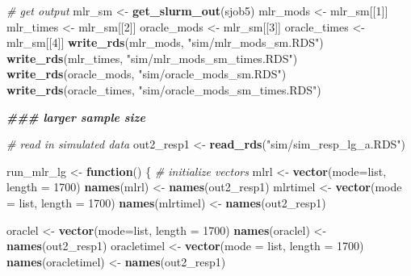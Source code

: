 \documentclass[12pt, twoside]{amherstthesis}
\newenvironment{Shaded}{\begin{snugshade}}{\end{snugshade}}
\newcommand{\AttributeTok}[1]{\textcolor[rgb]{0.13,0.29,0.53}{#1}}
\newcommand{\CommentTok}[1]{\textcolor[rgb]{0.56,0.35,0.01}{\textit{#1}}}
\newcommand{\ControlFlowTok}[1]{\textcolor[rgb]{0.13,0.29,0.53}{\textbf{#1}}}
\newcommand{\DecValTok}[1]{\textcolor[rgb]{0.00,0.00,0.81}{#1}}
\newcommand{\DocumentationTok}[1]{\textcolor[rgb]{0.56,0.35,0.01}{\textbf{\textit{#1}}}}
\newcommand{\FunctionTok}[1]{\textcolor[rgb]{0.13,0.29,0.53}{\textbf{#1}}}
\newcommand{\NormalTok}[1]{#1}
\newcommand{\OtherTok}[1]{\textcolor[rgb]{0.56,0.35,0.01}{#1}}
\newcommand{\StringTok}[1]{\textcolor[rgb]{0.31,0.60,0.02}{#1}}
\begin{document}
\begin{Shaded}
\begin{Highlighting}[]
\CommentTok{\# get output}
\NormalTok{mlr\_sm }\OtherTok{\textless{}{-}} \FunctionTok{get\_slurm\_out}\NormalTok{(sjob5)}
\NormalTok{mlr\_mods }\OtherTok{\textless{}{-}}\NormalTok{ mlr\_sm[[}\DecValTok{1}\NormalTok{]]}
\NormalTok{mlr\_times }\OtherTok{\textless{}{-}}\NormalTok{ mlr\_sm[[}\DecValTok{2}\NormalTok{]]}
\NormalTok{oracle\_mods }\OtherTok{\textless{}{-}}\NormalTok{ mlr\_sm[[}\DecValTok{3}\NormalTok{]]}
\NormalTok{oracle\_times }\OtherTok{\textless{}{-}}\NormalTok{ mlr\_sm[[}\DecValTok{4}\NormalTok{]]}
\FunctionTok{write\_rds}\NormalTok{(mlr\_mods, }\StringTok{"sim/mlr\_mods\_sm.RDS"}\NormalTok{)}
\FunctionTok{write\_rds}\NormalTok{(mlr\_times, }\StringTok{"sim/mlr\_mods\_sm\_times.RDS"}\NormalTok{)}
\FunctionTok{write\_rds}\NormalTok{(oracle\_mods, }\StringTok{"sim/oracle\_mods\_sm.RDS"}\NormalTok{)}
\FunctionTok{write\_rds}\NormalTok{(oracle\_times, }\StringTok{"sim/oracle\_mods\_sm\_times.RDS"}\NormalTok{)}

\DocumentationTok{\#\#\# larger sample size}

\CommentTok{\# read in simulated data}
\NormalTok{out2\_resp1 }\OtherTok{\textless{}{-}} \FunctionTok{read\_rds}\NormalTok{(}\StringTok{"sim/sim\_resp\_lg\_a.RDS"}\NormalTok{)}

\NormalTok{run\_mlr\_lg }\OtherTok{\textless{}{-}} \ControlFlowTok{function}\NormalTok{() \{}
  \CommentTok{\# initialize vectors}
\NormalTok{  mlrl }\OtherTok{\textless{}{-}} \FunctionTok{vector}\NormalTok{(}\AttributeTok{mode=}\StringTok{\textquotesingle{}list\textquotesingle{}}\NormalTok{, }\AttributeTok{length =} \DecValTok{1700}\NormalTok{)}
  \FunctionTok{names}\NormalTok{(mlrl) }\OtherTok{\textless{}{-}} \FunctionTok{names}\NormalTok{(out2\_resp1)}
\NormalTok{  mlrtimel }\OtherTok{\textless{}{-}} \FunctionTok{vector}\NormalTok{(}\AttributeTok{mode =} \StringTok{\textquotesingle{}list\textquotesingle{}}\NormalTok{, }\AttributeTok{length =} \DecValTok{1700}\NormalTok{)}
  \FunctionTok{names}\NormalTok{(mlrtimel) }\OtherTok{\textless{}{-}} \FunctionTok{names}\NormalTok{(out2\_resp1)}
  
\NormalTok{  oraclel }\OtherTok{\textless{}{-}} \FunctionTok{vector}\NormalTok{(}\AttributeTok{mode=}\StringTok{\textquotesingle{}list\textquotesingle{}}\NormalTok{, }\AttributeTok{length =} \DecValTok{1700}\NormalTok{)}
  \FunctionTok{names}\NormalTok{(oraclel) }\OtherTok{\textless{}{-}} \FunctionTok{names}\NormalTok{(out2\_resp1)}
\NormalTok{  oracletimel }\OtherTok{\textless{}{-}} \FunctionTok{vector}\NormalTok{(}\AttributeTok{mode =} \StringTok{\textquotesingle{}list\textquotesingle{}}\NormalTok{, }\AttributeTok{length =} \DecValTok{1700}\NormalTok{)}
  \FunctionTok{names}\NormalTok{(oracletimel) }\OtherTok{\textless{}{-}} \FunctionTok{names}\NormalTok{(out2\_resp1)}
  

\end{Highlighting}
\end{Shaded}
\end{document}
